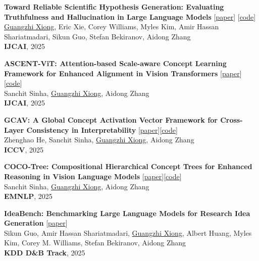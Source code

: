 \documentclass[10pt, letterpaper]{article}
\begin{document}
\begin{enumerate}[label={[\arabic*]}]
            \item \textbf{Toward Reliable Scientific Hypothesis Generation: Evaluating Truthfulness and Hallucination in Large Language Models} [\href{https://www.ijcai.org/proceedings/2025/0873}{paper}] [\href{https://github.com/gzxiong/TruthHypo}{code}] \\
            \underline{Guangzhi Xiong}, Eric Xie, Corey Williams, Myles Kim, Amir Hassan Shariatmadari, Sikun Guo, Stefan Bekiranov, Aidong Zhang \\
            \textbf{IJCAI}, 2025
            
            \item \textbf{ASCENT-ViT: Attention-based Scale-aware Concept Learning Framework for Enhanced Alignment in Vision Transformers} [\href{https://www.ijcai.org/proceedings/2025/0058}{paper}] [\href{https://github.com/sanchit97/ASCENT-ViT}{code}] \\
            Sanchit Sinha, \underline{Guangzhi Xiong}, Aidong Zhang \\
            \textbf{IJCAI}, 2025

            \item \textbf{GCAV: A Global Concept Activation Vector Framework for Cross-Layer Consistency in Interpretability} [\href{https://arxiv.org/abs/2508.21197}{paper}][\href{https://github.com/Zhenghao-He/GCAV}{code}]\\
            Zhenghao He, Sanchit Sinha, \underline{Guangzhi Xiong}, Aidong Zhang \\
            \textbf{ICCV}, 2025

            \item \textbf{COCO-Tree: Compositional Hierarchical Concept Trees for Enhanced Reasoning in Vision Language Models} [\href{https://arxiv.org/abs/2510.11012}{paper}][\href{https://github.com/sanchit97/COCO-Tree}{code}]\\
            Sanchit Sinha, \underline{Guangzhi Xiong}, Aidong Zhang \\
            \textbf{EMNLP}, 2025
            
            \item \textbf{IdeaBench: Benchmarking Large Language Models for Research Idea Generation} [\href{https://arxiv.org/abs/2411.02429}{paper}] \\
            Sikun Guo, Amir Hassan Shariatmadari, \underline{Guangzhi Xiong}, Albert Huang, Myles Kim, Corey M. Williams, Stefan Bekiranov, Aidong Zhang \\
            \textbf{KDD D\&B Track}, 2025


\end{enumerate}
\end{document}
